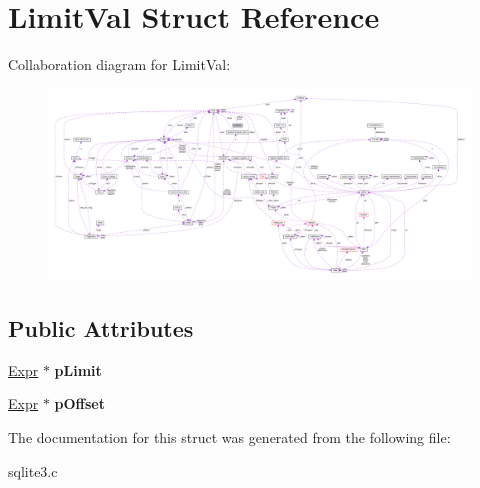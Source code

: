 \hypertarget{struct_limit_val}{\section{Limit\-Val Struct Reference}
\label{struct_limit_val}
}


Collaboration diagram for Limit\-Val\-:\nopagebreak
\begin{figure}[H]
\begin{center}
\leavevmode
\includegraphics[width=350pt]{struct_limit_val__coll__graph}
\end{center}
\end{figure}
\subsection*{Public Attributes}
\begin{DoxyCompactItemize}
\item 
\hypertarget{struct_limit_val_a96094d1b395a3f455263ff5907d72ed6}{\hyperlink{struct_expr}{Expr} $\ast$ {\bfseries p\-Limit}}\label{struct_limit_val_a96094d1b395a3f455263ff5907d72ed6}

\item 
\hypertarget{struct_limit_val_a43dedf453a8e5cb8091fcde524a7c736}{\hyperlink{struct_expr}{Expr} $\ast$ {\bfseries p\-Offset}}\label{struct_limit_val_a43dedf453a8e5cb8091fcde524a7c736}

\end{DoxyCompactItemize}


The documentation for this struct was generated from the following file\-:\begin{DoxyCompactItemize}
\item 
sqlite3.\-c\end{DoxyCompactItemize}
